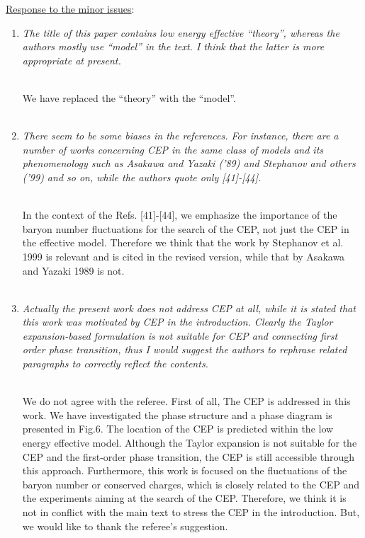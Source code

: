 \documentclass[aps,article,author-year,notitlepage,showpacs]{revtex4-1}
\begin{document}
\noindent \underline{Response to the minor issues}:\\

\begin{enumerate}[1.]

\item {\it The title of this paper contains low energy effective ``theory'', whereas the authors mostly use ``model'' in the text. I think that the latter is more appropriate at present.} \\[0.3ex] 
 
We have replaced the ``theory'' with the ``model''. \\[0.3ex] 

\item {\it There seem to be some biases in the references. For instance, there are a number of works concerning CEP in the same class of models and its phenomenology such as Asakawa and Yazaki ('89) and Stephanov and others ('99) and so on, while the authors quote only [41]-[44].} \\[0.3ex] 

In the context of the Refs. [41]-[44], we emphasize the importance of the baryon number fluctuations for the search of the CEP, not just the CEP in the effective model. Therefore we think that the work by Stephanov et al. 1999 is relevant and is cited in the revised version, while that by Asakawa and Yazaki 1989 is not.\\[0.3ex] 

\item {\it Actually the present work does not address CEP at all, while it is stated that this work was motivated by CEP in the introduction. Clearly the Taylor expansion-based formulation is not suitable for CEP and connecting first order phase transition, thus I would suggest the authors to rephrase related paragraphs to correctly reflect the contents.}\\[0.3ex] 

We do not agree with the referee. First of all, The CEP is addressed in this work. We have investigated the phase structure and a phase diagram is presented in Fig.6. The location of the CEP is predicted within the low energy effective model. Although the Taylor expansion is not suitable for the CEP and the first-order phase transition, the CEP is still accessible through this approach. Furthermore, this work is focused on the fluctuations of the baryon number or conserved charges, which is closely related to the CEP and the experiments aiming at the search of the CEP. Therefore, we think it is not in conflict with the main text to stress the CEP in the introduction. But, we would like to thank the referee's suggestion.


\end{enumerate}
\end{document}
